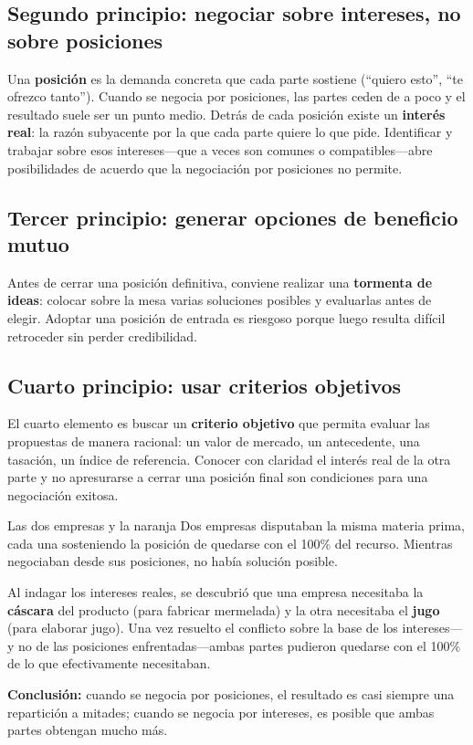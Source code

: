 \documentclass[12pt,oneside]{book}
\begin{document}
\subsection{Segundo principio: negociar sobre intereses, no sobre posiciones}

Una \textbf{posición} es la demanda concreta que cada parte sostiene
(``quiero esto'', ``te ofrezco tanto''). Cuando se negocia por
posiciones, las partes ceden de a poco y el resultado suele ser un
punto medio. Detrás de cada posición existe un \textbf{interés real}:
la razón subyacente por la que cada parte quiere lo que pide. Identificar
y trabajar sobre esos intereses---que a veces son comunes o
compatibles---abre posibilidades de acuerdo que la negociación por
posiciones no permite.

\subsection{Tercer principio: generar opciones de beneficio mutuo}

Antes de cerrar una posición definitiva, conviene realizar una
\textbf{tormenta de ideas}: colocar sobre la mesa varias soluciones
posibles y evaluarlas antes de elegir. Adoptar una posición de entrada
es riesgoso porque luego resulta difícil retroceder sin perder
credibilidad.

\subsection{Cuarto principio: usar criterios objetivos}

El cuarto elemento es buscar un \textbf{criterio objetivo} que permita
evaluar las propuestas de manera racional: un valor de mercado, un
antecedente, una tasación, un índice de referencia. Conocer con
claridad el interés real de la otra parte y no apresurarse a cerrar
una posición final son condiciones para una negociación exitosa.

\begin{example}{Las dos empresas y la naranja}
Dos empresas disputaban la misma materia prima, cada una sosteniendo
la posición de quedarse con el 100\% del recurso. Mientras negociaban
desde sus posiciones, no había solución posible.

Al indagar los intereses reales, se descubrió que una empresa necesitaba
la \textbf{cáscara} del producto (para fabricar mermelada) y la otra
necesitaba el \textbf{jugo} (para elaborar jugo). Una vez resuelto el
conflicto sobre la base de los intereses---y no de las posiciones
enfrentadas---ambas partes pudieron quedarse con el 100\% de lo que
efectivamente necesitaban.

\textbf{Conclusión:} cuando se negocia por posiciones, el resultado
es casi siempre una repartición a mitades; cuando se negocia por
intereses, es posible que ambas partes obtengan mucho más.
\end{example}
\end{document}
